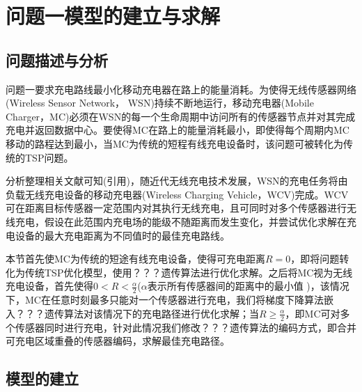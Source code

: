 \documentclass{whutmod}
\newcommand{\upcite}[1]{\textsuperscript{\cite{#1}}}
\begin{document}
	\section{问题一模型的建立与求解}
		\subsection{问题描述与分析}
		
			问题一要求充电路线最小化移动充电器在路上的能量消耗。为使得无线传感器网络
		(Wireless Sensor Network，	WSN)持续不断地运行，移动充电器(Mobile Charger，MC)必须在WSN的每一个生命周期中访问所有的传感器节点并对其完成充电并返回数据中心。要使得MC在路上的能量消耗最小，即使得每个周期内MC移动的路程达到最小，当MC为传统的短程有线充电设备时，该问题可被转化为传统的TSP问题。
		    
		    分析整理相关文献可知(引用)，随近代无线充电技术发展，WSN的充电任务将由负载无线充电设备的移动充电器(Wireless Charging Vehicle，WCV)完成。WCV可在距离目标传感器一定范围内对其执行无线充电，且可同时对多个传感器进行无线充电，假设在此范围内充电场的能级不随距离而发生变化，并尝试优化求解在充电设备的最大充电距离为不同值时的最佳充电路线。
		    
		    本节首先使MC为传统的短途有线充电设备，使得可充电距离$R=0$，即将问题转化为传统TSP优化模型，使用？？？遗传算法进行优化求解。之后将MC视为无线充电设备，首先使得$0<R<\frac{\alpha }{2}$($\alpha$表示所有传感器间的距离中的最小值 )，该情况下，MC在任意时刻最多只能对一个传感器进行充电，我们将梯度下降算法嵌入？？？遗传算法对该情况下的充电路径进行优化求解；当$R\geqslant \frac{\alpha }{2}$，即MC可对多个传感器同时进行充电，针对此情况我们修改？？？遗传算法的编码方式，即合并可充电区域重叠的传感器编码，求解最佳充电路径。
			
			
		
		
		
		\subsection{模型的建立}
\end{document}
